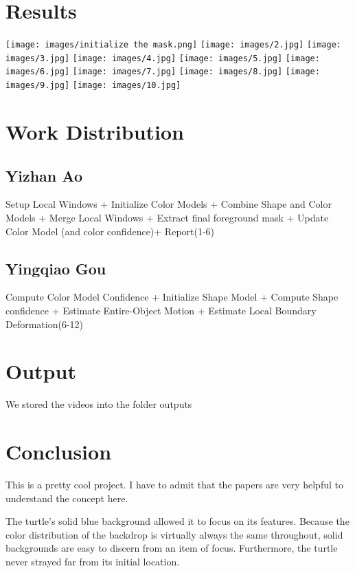 \documentclass[15pt]{article}
\begin{document}
\section{Results}

\texttt{[image: images/initialize the mask.png]}
\texttt{[image: images/2.jpg]}
\texttt{[image: images/3.jpg]}
\texttt{[image: images/4.jpg]}
\texttt{[image: images/5.jpg]}
\texttt{[image: images/6.jpg]}
\texttt{[image: images/7.jpg]}
\texttt{[image: images/8.jpg]}
\texttt{[image: images/9.jpg]}
\texttt{[image: images/10.jpg]}






\section{Work Distribution}
\subsection{Yizhan Ao}
Setup Local Windows + Initialize Color Models + Combine Shape and Color Models + Merge Local Windows + Extract final foreground mask + Update Color Model (and color confidence)+ Report(1-6)
\subsection{Yingqiao Gou}
Compute Color Model Confidence + Initialize Shape Model + Compute Shape confidence + Estimate Entire-Object Motion + Estimate Local Boundary Deformation(6-12)

\section{Output}
We stored the videos into the folder outputs

\section{Conclusion}
This is a pretty cool project. I have to admit that the papers are very helpful to understand the concept here. 

The turtle's solid blue background allowed it to focus on its features. Because the color distribution of the backdrop is virtually always the same throughout, solid backgrounds are easy to discern from an item of focus. Furthermore, the turtle never strayed far from its initial location.
\end{document}
